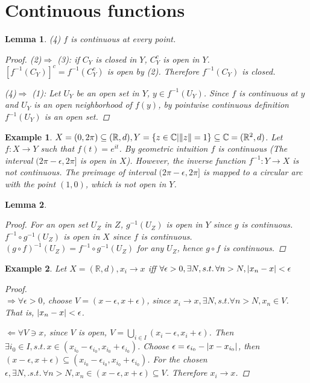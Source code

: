 \documentclass{article}
\DeclarePairedDelimiter\norm{\lVert}{\rVert}
\DeclarePairedDelimiter\abs{\lvert}{\rvert}
\newtheorem{example}{Example}[section] %
\newtheorem{lemma}{Lemma}[section]
\begin{document}
\section{Continuous functions}
\setcounter{lemma}{1}
\begin{lemma}
(4) $f$ is continuous at every point.
\begin{proof}\mbox{}

(2)$\Rightarrow$ (3): if $C_Y$ is closed in $Y$, $C_Y^c$ is open in $Y$. $[f^{-1}(C_Y)]^{c}=f^{-1}(C_Y^c)$ is open by (2). Therefore $f^{-1}(C_Y)$ is closed.

(4)$\Rightarrow$ (1): Let $U_Y$ be an open set in $Y$, $y \in f^{-1}(U_Y)$. Since $f$ is continuous at $y$ and $U_Y$ is an open neighborhood of $f(y)$, by pointwise continuous definition $f^{-1}(U_Y)$ is an open set.
\end{proof}
\end{lemma}
\setcounter{example}{2}
\begin{example}\label{eg:23}
$X=(0,2\pi)\subseteq (\mathbb{R},d),Y=\{z\in \mathbb{C}|\norm{z}=1\}\subseteq \mathbb{C}=(\mathbb{R}^2,d)$. Let $f: X\to Y$ such that $f(t)=e^{it}$.
By geometric intuition $f$ is continuous (The interval $(2\pi-\epsilon,2\pi]$ is open in $X$). However, the inverse function $f^{-1}: Y\to X$ is not continuous.
The preimage of interval $(2\pi-\epsilon,2\pi]$ is mapped to a circular arc with the point $(1,0)$, which is not open in $Y$.
\end{example}
\setcounter{lemma}{3}
\begin{lemma}
\begin{proof}
For an open set $U_Z$ in $Z$, $g^{-1}(U_Z)$ is open in $Y$ since $g$ is continuous. $ f^{-1} \circ g^{-1}(U_Z)$ is open in $X$ since $f$ is continuous.
 $(g\circ f)^{-1}(U_Z)=f^{-1} \circ g^{-1}(U_Z)$ for any $U_Z$, hence $g\circ f$ is continuous.
\end{proof}
\end{lemma}
\setcounter{example}{4}
\begin{example}
Let $X=(\mathbb{R},d),x_i\to x$ iff $\forall \epsilon >0, \exists N,s.t.\, \forall n>N,\abs{x_n-x}<\epsilon$
\begin{proof}
\quad\\
\indent$\Rightarrow \forall \epsilon>0$, choose $V=(x-\epsilon,x+\epsilon)$, since $x_i\to x, \exists N,s.t. \forall n>N, x_n \in V$. That is,
$\abs{x_n-x}<\epsilon$.

$\Leftarrow \forall V \ni x$, since $V$ is open, $V=\bigcup_{i\in I} (x_i-\epsilon,x_i+\epsilon)$. Then $\exists i_0 \in I,s.t. \,x\in (x_{i_0}-\epsilon_{i_0},x_{i_0}+\epsilon_{i_0})$. Choose $\epsilon = \epsilon_{i_0}-\abs{x-x_{i_0}}$, then $(x-\epsilon,x+\epsilon)\subseteq (x_{i_0}-\epsilon_{i_0},x_{i_0}+\epsilon_{i_0})$. For the chosen $\epsilon,\exists N,.s.t.\, \forall n>N, x_n \in (x-\epsilon,x+\epsilon)\subseteq V$. Therefore $x_i\to x$.
\end{proof}
\end{example}
\end{document}
